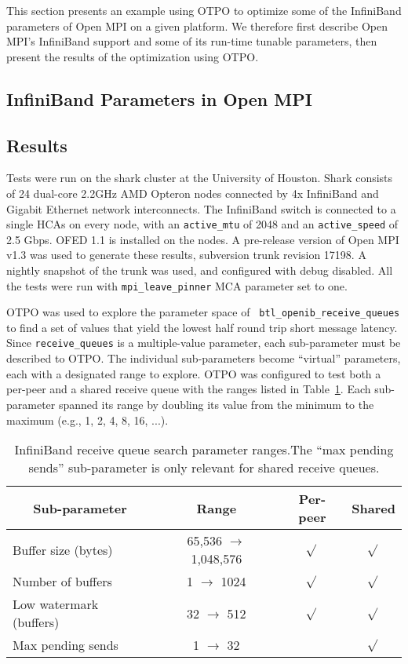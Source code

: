 This section presents an example using OTPO to optimize some of the
InfiniBand parameters of Open MPI on a given platform.  We therefore
first describe Open MPI's InfiniBand support and some of its run-time
tunable parameters, then present the results of the optimization using
OTPO.

\subsection{InfiniBand Parameters in Open MPI}



\subsection{Results}

Tests were run on the shark cluster at the University of Houston.
Shark consists of 24 dual-core 2.2GHz AMD Opteron nodes connected by
4x InfiniBand and Gigabit Ethernet network interconnects.  
The InfiniBand switch is connected to a single HCAs on every node, with an {\tt active\_mtu} of 2048 and an {\tt active\_speed} of 2.5 Gbps. OFED 1.1 is installed on the nodes.  A pre-release version of Open MPI v1.3 was used to generate these results, subversion trunk revision 17198. A nightly snapshot of the trunk was used, and configured with debug disabled. All the tests were run with
{\tt mpi\_leave\_pinner} MCA parameter set to one.

OTPO was used to explore the parameter space of {\tt
  btl\_\-openib\_\-receive\_\-queues} to find a set of values that
yield the lowest half round trip short message latency.  Since {\tt receive\_\-queues}
is a multiple-value parameter, each sub-parameter must be described to
OTPO.  The individual sub-parameters become ``virtual'' parameters,
each with a designated range to explore.  OTPO was configured to test
both a per-peer and a shared receive queue with the ranges listed in
Table~\ref{table:eval-queue-search-params}.  Each sub-parameter
spanned its range by doubling its value from the minimum to the
maximum (e.g., 1, 2, 4, 8, 16, ...).

\def\yes{$\sqrt{}$}

\begin{table}[tb]
\centering
\caption{InfiniBand receive queue search parameter ranges.The ``max
  pending sends'' sub-parameter is only relevant for shared receive
  queues.}
\label{table:eval-queue-search-params} 
\begin{tabular}{|l|c|c|c|} 
\multicolumn{1}{c}{Sub-parameter} &
\multicolumn{1}{c}{Range} &
\multicolumn{1}{c}{Per-peer} &
\multicolumn{1}{c}{Shared} \\
\hline
Buffer size (bytes) & 65,536 $\rightarrow$ 1,048,576 & \yes & \yes \\
Number of buffers & 1 $\rightarrow$ 1024 & \yes & \yes \\
Low watermark (buffers) & 32 $\rightarrow$ 512  & \yes & \yes \\
Max pending sends & 1 $\rightarrow$ 32 & & \yes \\
\hline
\end{tabular}
\end{table}

